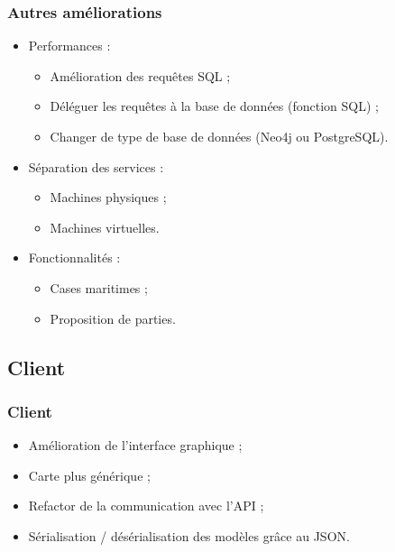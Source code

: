 	\begin{frame}
		\frametitle{Autres améliorations}
		\begin{itemize}
			\item Performances :
				\begin{itemize}
					\item Amélioration des requêtes SQL ;
					\item Déléguer les requêtes à la base de données (fonction SQL) ;
					\item Changer de type de base de données (Neo4j ou PostgreSQL).
				\end{itemize}
			\item Séparation des services :
				\begin{itemize}
					\item Machines physiques ;
					\item Machines virtuelles.
				\end{itemize}
			\item Fonctionnalités :
				\begin{itemize}
					\item Cases maritimes ;
					\item Proposition de parties.
				\end{itemize}
		\end{itemize}
	\end{frame}

\subsection{Client}
	\begin{frame}
		\frametitle{Client}
		\begin{itemize}
			\item Amélioration de l'interface graphique ;
			\item Carte plus générique ;
			\item Refactor de la communication avec l'API ;
			\item Sérialisation / désérialisation des modèles grâce au JSON.
		\end{itemize}
	\end{frame}
